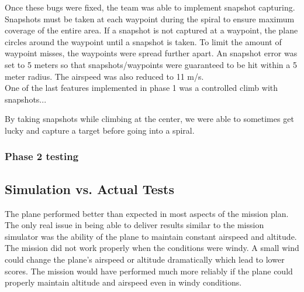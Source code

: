 \documentclass[11pt]{article}
\begin{document}
	Once these bugs were fixed, the team was able to implement snapshot capturing. Snapshots must be taken at each waypoint during the spiral to ensure maximum coverage of the entire area. If a snapshot is not captured at a waypoint, the plane circles around the waypoint until a snapshot is taken. To limit the amount of waypoint misses, the waypoints were spread further apart. An snapshot error was set to 5 meters so that snapshots/waypoints were guaranteed to be hit within a 5 meter radius. The airspeed was also reduced to 11 m/s.\\

	One of the last features implemented in phase 1 was a controlled climb with snapshots...


By taking snapshots while climbing at the center, we were able to sometimes get lucky and capture a target before going into a spiral.

\subsubsection{Phase 2 testing}

\subsection{Simulation vs. Actual Tests}
\label{simvsact}
The plane performed better than expected in most aspects of the mission plan. The only real issue in being able to deliver results similar to the mission simulator was the ability of the plane to maintain constant airspeed and altitude. The mission did not work properly when the conditions were windy. A small wind could change the plane's airspeed or altitude dramatically which lead to lower scores. The mission would have performed much more reliably if the plane could properly maintain altitude and airspeed even in windy conditions.\\
\end{document}
